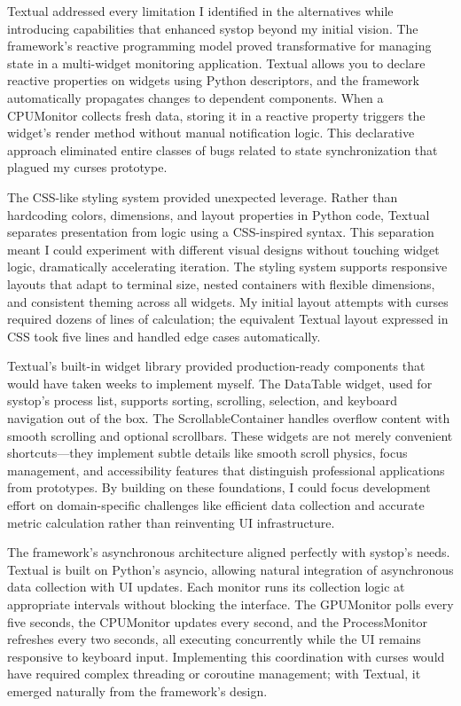 \documentclass[12pt,a4paper]{article}
\begin{document}
Textual addressed every limitation I identified in the alternatives while introducing capabilities that enhanced systop beyond my initial vision. The framework's reactive programming model proved transformative for managing state in a multi-widget monitoring application. Textual allows you to declare reactive properties on widgets using Python descriptors, and the framework automatically propagates changes to dependent components. When a CPUMonitor collects fresh data, storing it in a reactive property triggers the widget's render method without manual notification logic. This declarative approach eliminated entire classes of bugs related to state synchronization that plagued my curses prototype.

The CSS-like styling system provided unexpected leverage. Rather than hardcoding colors, dimensions, and layout properties in Python code, Textual separates presentation from logic using a CSS-inspired syntax. This separation meant I could experiment with different visual designs without touching widget logic, dramatically accelerating iteration. The styling system supports responsive layouts that adapt to terminal size, nested containers with flexible dimensions, and consistent theming across all widgets. My initial layout attempts with curses required dozens of lines of calculation; the equivalent Textual layout expressed in CSS took five lines and handled edge cases automatically.

Textual's built-in widget library provided production-ready components that would have taken weeks to implement myself. The DataTable widget, used for systop's process list, supports sorting, scrolling, selection, and keyboard navigation out of the box. The ScrollableContainer handles overflow content with smooth scrolling and optional scrollbars. These widgets are not merely convenient shortcuts—they implement subtle details like smooth scroll physics, focus management, and accessibility features that distinguish professional applications from prototypes. By building on these foundations, I could focus development effort on domain-specific challenges like efficient data collection and accurate metric calculation rather than reinventing UI infrastructure.

The framework's asynchronous architecture aligned perfectly with systop's needs. Textual is built on Python's asyncio, allowing natural integration of asynchronous data collection with UI updates. Each monitor runs its collection logic at appropriate intervals without blocking the interface. The GPUMonitor polls every five seconds, the CPUMonitor updates every second, and the ProcessMonitor refreshes every two seconds, all executing concurrently while the UI remains responsive to keyboard input. Implementing this coordination with curses would have required complex threading or coroutine management; with Textual, it emerged naturally from the framework's design.
\end{document}
